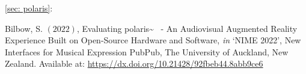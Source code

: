 \vspace*{0.75cm}
\noindent\autoref{sec: polaris}:  \\ \citep{bilbow2022}

\begin{hangparas}{.25in}{1}
	Bilbow, S. $(2022)$, Evaluating polaris\textasciitilde{}~ - An Audiovisual Augmented Reality Experience Built on Open-Source Hardware and Software, \textit{in} `NIME 2022', New Interfaces for Musical Expression PubPub, The University of Auckland, New Zealand. Available at: \url{https://dx.doi.org/10.21428/92fbeb44.8abb9ce6}
\end{hangparas}